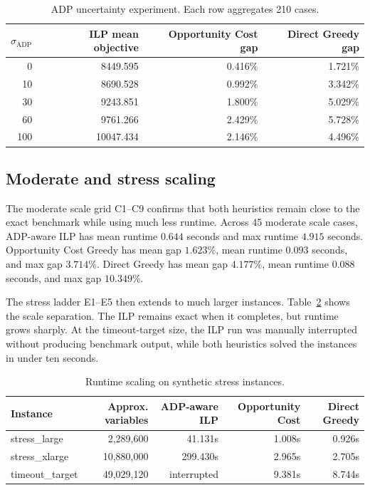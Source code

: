 \documentclass[12pt]{article}
\begin{document}
\begin{table}[H]
\centering
\small
\caption{ADP uncertainty experiment. Each row aggregates 210 cases.}
\label{tab:n5}
\begin{tabular}{rrrr}
\toprule
\(\sigma_{\text{ADP}}\) & ILP mean objective & Opportunity Cost gap & Direct Greedy gap\\
\midrule
0 & 8449.595 & 0.416\% & 1.721\%\\
10 & 8690.528 & 0.992\% & 3.342\%\\
30 & 9243.851 & 1.800\% & 5.029\%\\
60 & 9761.266 & 2.429\% & 5.728\%\\
100 & 10047.434 & 2.146\% & 4.496\%\\
\bottomrule
\end{tabular}
\end{table}

\subsection{Moderate and stress scaling}
The moderate scale grid C1--C9 confirms that both heuristics remain close to the exact benchmark while using much less runtime. Across 45 moderate scale cases, ADP-aware ILP has mean runtime \(0.644\) seconds and max runtime \(4.915\) seconds. Opportunity Cost Greedy has mean gap \(1.623\%\), mean runtime \(0.093\) seconds, and max gap \(3.714\%\). Direct Greedy has mean gap \(4.177\%\), mean runtime \(0.088\) seconds, and max gap \(10.349\%\).

The stress ladder E1--E5 then extends to much larger instances. Table~\ref{tab:scaling} shows the scale separation. The ILP remains exact when it completes, but runtime grows sharply. At the timeout-target size, the ILP run was manually interrupted without producing benchmark output, while both heuristics solved the instances in under ten seconds.

\begin{table}[H]
\centering
\small
\caption{Runtime scaling on synthetic stress instances.}
\label{tab:scaling}
\begin{tabular}{lrrrr}
\toprule
Instance & Approx. variables & ADP-aware ILP & Opportunity Cost & Direct Greedy\\
\midrule
stress\_large & 2,289,600 & 41.131s & 1.008s & 0.926s\\
stress\_xlarge & 10,880,000 & 299.430s & 2.965s & 2.705s\\
timeout\_target & 49,029,120 & interrupted & 9.381s & 8.744s\\
\bottomrule
\end{tabular}
\end{table}
\end{document}
